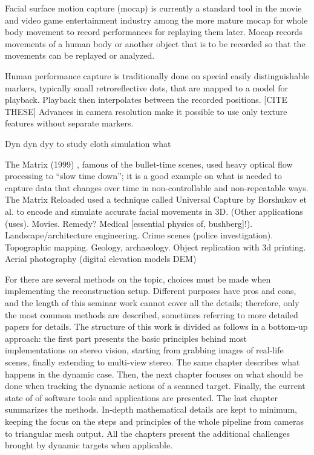 Facial surface motion capture (mocap) is currently a standard tool in the movie and video game entertainment industry among the more mature mocap for whole body movement to record performances for replaying them later.
Mocap records movements of a human body or another object that is to be recorded so that the movements can be replayed or analyzed.

Human performance capture is traditionally done on special easily distinguishable markers, typically small retroreflective dots, that are mapped to a model for playback. Playback then interpolates between the recorded positions. [CITE THESE] Advances in camera resolution make it possible to use only texture features without separate markers.

Dyn dyn dyy to study cloth simulation what

The Matrix (1999) \cite{wachowski99matrix}, famous of the bullet-time scenes, used heavy optical flow processing to ``slow time down''; it is a good example on what is needed to capture data that changes over time in non-controllable and non-repeatable ways. The Matrix Reloaded \cite{wachowski03reloaded} used a technique called Universal Capture by Borshukov et al. \cite{borshukov05universal} to encode and simulate accurate facial movements in 3D.
(Other applications (uses). Movies. Remedy? Medical [essential physics of, bushberg]!). Landscape/architecture engineering. Crime scenes (police investigation). Topographic mapping. Geology, archaeology. Object replication with 3d printing. Aerial photography (digital elevation models DEM)

For there are several methods on the topic, choices must be made when implementing the reconstruction setup.
Different purposes have pros and cons, and the length of this seminar work cannot cover all the details; therefore, only the most common methods are described, sometimes referring to more detailed papers for details.
The structure of this work is divided as follows in a bottom-up approach: the first part presents the basic principles behind most implementations on stereo vision, starting from grabbing images of real-life scenes, finally extending to multi-view stereo.
The same chapter describes what happens in the dynamic case.
Then, the next chapter focuses on what should be done when tracking the dynamic actions of a scanned target.
Finally, the current state of of software tools and applications are presented. The last chapter summarizes the methods.
In-depth mathematical details are kept to minimum, keeping the focus on the steps and principles of the whole pipeline from cameras to triangular mesh output. All the chapters present the additional challenges brought by dynamic targets when applicable.

